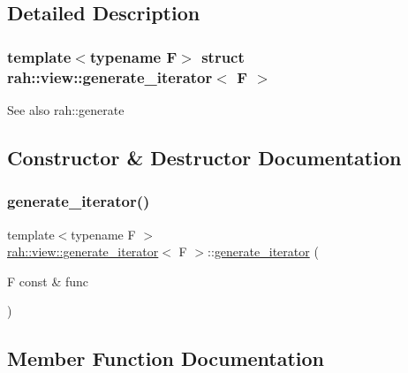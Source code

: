 \subsection{Detailed Description}
\subsubsection*{template$<$typename F$>$\newline
struct rah\+::view\+::generate\+\_\+iterator$<$ F $>$}

\begin{DoxySeeAlso}{See also}
rah\+::generate 
\end{DoxySeeAlso}


\subsection{Constructor \& Destructor Documentation}
\mbox{\label{structrah_1_1view_1_1generate__iterator_a407696209d96fe38234970a91d23e35f}} 
\subsubsection{\texorpdfstring{generate\_iterator()}{generate\_iterator()}}
{\footnotesize\ttfamily template$<$typename F $>$ \\
\mbox{\hyperlink{structrah_1_1view_1_1generate__iterator}{rah\+::view\+::generate\+\_\+iterator}}$<$ F $>$\+::\mbox{\hyperlink{structrah_1_1view_1_1generate__iterator}{generate\+\_\+iterator}} (\begin{DoxyParamCaption}\item[{F const \&}]{func }\end{DoxyParamCaption})\hspace{0.3cm}{\ttfamily [inline]}}



\subsection{Member Function Documentation}
\mbox{\label{structrah_1_1view_1_1generate__iterator_ab7b0cf4a8f45cfd67278935bd9a39c13}} 
